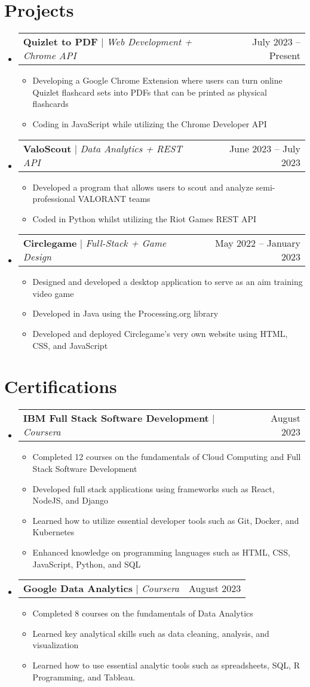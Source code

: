 \documentclass[letterpaper,11pt]{article}
\makeatletter
\newcommand{\resumeItem}[1]{
  \item\small{
    {#1 \vspace{-2pt}}
  }
}
\newcommand{\resumeProjectHeading}[2]{
    \item
    \begin{tabular*}{0.97\textwidth}{l@{\extracolsep{\fill}}r}
      \small#1 & #2 \\
    \end{tabular*}\vspace{-7pt}
}
\newcommand{\resumeSubHeadingListStart}{\begin{itemize}[leftmargin=0.15in, label={}]}
\newcommand{\resumeSubHeadingListEnd}{\end{itemize}}
\newcommand{\resumeItemListStart}{\begin{itemize}}
\newcommand{\resumeItemListEnd}{\end{itemize}\vspace{-5pt}}
\makeatother
\begin{document}
\section{Projects}
    \resumeSubHeadingListStart
      \resumeProjectHeading
          {\textbf{Quizlet to PDF} $|$ \emph{Web Development + Chrome API}}{July 2023 -- Present}
          \resumeItemListStart
            \resumeItem{Developing a Google Chrome Extension where users can turn online Quizlet flashcard sets into PDFs that can be printed as physical flashcards}
            \resumeItem{Coding in JavaScript while utilizing the Chrome Developer API}
          \resumeItemListEnd
      \resumeProjectHeading
          {\textbf{ValoScout} $|$ \emph{Data Analytics + REST API}}{June 2023 -- July 2023}
          \resumeItemListStart
            \resumeItem{Developed a program that allows users to scout and analyze semi-professional VALORANT teams}
            \resumeItem{Coded in Python whilst utilizing the Riot Games REST API}
          \resumeItemListEnd
      \resumeProjectHeading
          {\textbf{Circlegame} $|$ \emph{Full-Stack + Game Design}}{May 2022 -- January 2023}
          \resumeItemListStart
            \resumeItem{Designed and developed a desktop application to serve as an aim training video game}
            \resumeItem{Developed in Java using the Processing.org library}
            \resumeItem{Developed and deployed Circlegame's very own website using HTML, CSS, and JavaScript}
          \resumeItemListEnd
    \resumeSubHeadingListEnd


\section{Certifications}
    \resumeSubHeadingListStart
      \resumeProjectHeading
          {\textbf{IBM Full Stack Software Development} $|$ \emph{Coursera}}{August 2023}
          \resumeItemListStart
            \resumeItem{Completed 12 courses on the fundamentals of Cloud Computing and Full Stack Software Development}
            \resumeItem{Developed full stack applications using frameworks such as React, NodeJS, and Django}
            \resumeItem{Learned how to utilize essential developer tools such as Git, Docker, and Kubernetes}
            \resumeItem{Enhanced knowledge on programming languages such as HTML, CSS, JavaScript, Python, and SQL}
          \resumeItemListEnd
      \resumeProjectHeading
          {\textbf{Google Data Analytics} $|$ \emph{Coursera}}{August 2023}
          \resumeItemListStart
            \resumeItem{Completed 8 courses on the fundamentals of Data Analytics}
            \resumeItem{Learned key analytical skills such as data cleaning, analysis, and visualization}
            \resumeItem{Learned how to use essential analytic tools such as spreadsheets, SQL, R Programming, and Tableau.}
          \resumeItemListEnd
    \resumeSubHeadingListEnd
\end{document}
